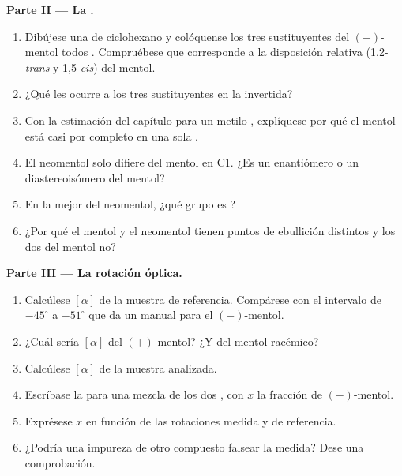 \begin{problem}
\medskip
\noindent\textbf{Parte II --- La .}
\begin{enumerate}[resume]
  \item Dibújese una  de ciclohexano y colóquense los tres
        sustituyentes del $(-)$-mentol todos . Compruébese que
        corresponde a la disposición relativa (1,2-\textit{trans} y
        1,5-\textit{cis}) del mentol.
  \item ¿Qué les ocurre a los tres sustituyentes en la  invertida?
  \item Con la estimación del capítulo para un metilo , explíquese
        por qué el mentol está casi por completo en una sola .
  \item El neomentol solo difiere del mentol en C1. ¿Es un enantiómero o un
        diastereoisómero del mentol?
  \item En la mejor  del neomentol, ¿qué grupo es ?
  \item ¿Por qué el mentol y el neomentol tienen puntos de ebullición
        distintos y los dos  del mentol no?
\end{enumerate}

\medskip
\noindent\textbf{Parte III --- La rotación óptica.}
\begin{enumerate}[resume]
  \item Calcúlese $[\alpha]$ de la muestra de referencia. Compárese con el
        intervalo de $-45^\circ$ a $-51^\circ$ que da un manual para el
        $(-)$-mentol.
  \item ¿Cuál sería $[\alpha]$ del $(+)$-mentol? ¿Y del mentol racémico?
  \item Calcúlese $[\alpha]$ de la muestra analizada.
  \item Escríbase la  para una mezcla de los dos ,
        con $x$ la fracción de $(-)$-mentol.
  \item Exprésese $x$ en función de las rotaciones medida y de
        referencia.
  \item ¿Podría una impureza  de otro compuesto falsear la medida?
        Dese una comprobación.
\end{enumerate}


\end{problem}
